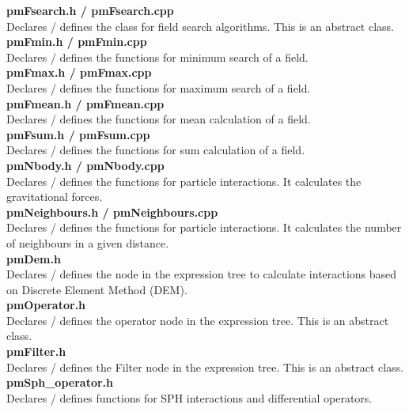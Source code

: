 \documentclass[a4paper,12pt,openany]{book}
\theoremstyle{break}
\begin{document}
\textbf{pmFsearch.h / pmFsearch.cpp} \\
Declares / defines the class for field search algorithms. This is an abstract class. \\

\textbf{pmFmin.h / pmFmin.cpp} \\
Declares / defines the functions for minimum search of a field.  \\

\textbf{pmFmax.h / pmFmax.cpp} \\
Declares / defines the functions for maximum search of a field. \\

\textbf{pmFmean.h / pmFmean.cpp} \\
Declares / defines the functions for mean calculation of a field. \\

\textbf{pmFsum.h / pmFsum.cpp} \\
Declares / defines the functions for sum calculation of a field. \\

\textbf{pmNbody.h / pmNbody.cpp} \\
Declares / defines the functions for particle interactions. It calculates the gravitational forces. \\

\textbf{pmNeighbours.h / pmNeighbours.cpp} \\
Declares / defines the functions for particle interactions. It calculates the number of neighbours in a given distance. \\

\textbf{pmDem.h} \\
Declares / defines the node in the expression tree to calculate interactions based on Discrete Element Method (DEM). \\

\textbf{pmOperator.h} \\
Declares / defines the operator node in the expression tree. This is an abstract class. \\

\textbf{pmFilter.h} \\
Declares / defines the Filter node in the expression tree. This is an abstract class. \\

\textbf{pmSph\_operator.h} \\
Declares / defines functions for SPH interactions and differential operators. \\
\end{document}

